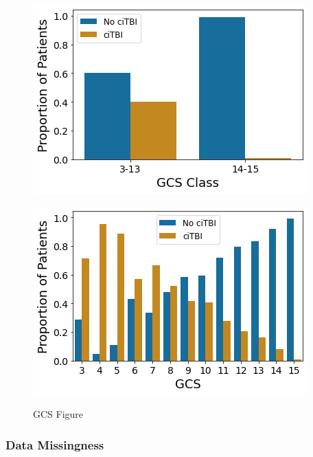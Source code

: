 \documentclass[11pt]{amsart}
\begin{document}
\begin{figure}
	\begin{minipage}[b]{0.5\linewidth}
		\centering
		\includegraphics[width=\textwidth]{GCSClass_prop.png}
		\label{fig:GCSClass}
	\end{minipage}%
	\begin{minipage}[b]{0.5\linewidth}
		\centering
		\includegraphics[width=\textwidth]{GCSTotal_prop.png}
		\label{fig:GCSTotal}
	\end{minipage}
	\caption{GCS Figure}\label{fig:GCS}
\end{figure}
\FloatBarrier

\subsubsection{Data Missingness}
\end{document}
